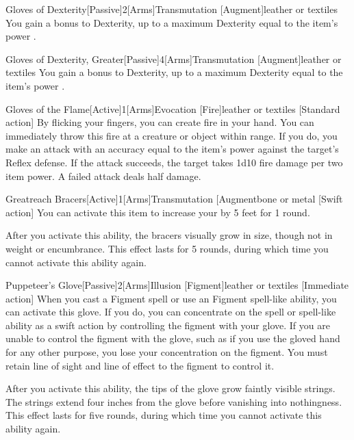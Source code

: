 \begin{magicitemdef}{Gloves of Dexterity}[Passive]{2}[Arms]{Transmutation [Augment]}{leather or textiles}
     You gain a  bonus to Dexterity, up to a maximum Dexterity equal to the item's power .
\end{magicitemdef}

\begin{magicitemdef}{Gloves of Dexterity, Greater}[Passive]{4}[Arms]{Transmutation [Augment]}{leather or textiles}
     You gain a  bonus to Dexterity, up to a maximum Dexterity equal to the item's power .
\end{magicitemdef}

\begin{magicitemdef}{Gloves of the Flame}[Active]{1}[Arms]{Evocation [Fire]}{leather or textiles}
    [Standard action] By flicking your fingers, you can create fire in your hand.
    You can immediately throw this fire at a creature or object within \rngclose range.
    If you do, you make an attack with an accuracy equal to the item's power against the target's Reflex defense.
    If the attack succeeds, the target takes 1d10 fire damage per two item power.
    A failed attack deals half damage.
\end{magicitemdef}

\begin{magicitemdef}{Greatreach Bracers}[Active]{1}[Arms]{Transmutation [Augment}{bone or metal}
    [Swift action] You can activate this item to increase your  by 5 feet for 1 round.

    After you activate this ability, the bracers visually grow in size, though not in weight or encumbrance.
    This effect lasts for 5 rounds, during which time you cannot activate this ability again.
\end{magicitemdef}

\begin{magicitemdef}{Puppeteer's Glove}[Passive]{2}[Arms]{Illusion [Figment]}{leather or textiles}
    [Immediate action] When you cast a Figment spell or use an Figment spell-like ability, you can activate this glove.
    If you do, you can concentrate on the spell or spell-like ability as a swift action by controlling the figment with your glove.
    If you are unable to control the figment with the glove, such as if you use the gloved hand for any other purpose, you lose your concentration on the figment.
    You must retain line of sight and line of effect to the figment to control it.

    After you activate this ability, the tips of the glove grow faintly visible strings.
    The strings extend four inches from the glove before vanishing into nothingness.
    This effect lasts for five rounds, during which time you cannot activate this ability again.
\end{magicitemdef}

